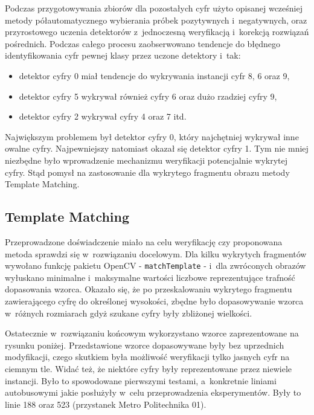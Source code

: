 Podczas przygotowywania zbiorów dla pozostałych cyfr użyto 
opisanej wcześniej metody półautomatycznego wybierania próbek pozytywnych
i~negatywnych, oraz przyrostowego uczenia detektorów z~jednoczesną
weryfikacją i~korekcją rozwiązań pośrednich. Podczas całego
procesu zaobserwowano tendencje do błędnego identyfikowania cyfr pewnej
klasy przez uczone detektory i~tak:

\begin{itemize}
    \item detektor cyfry 0 miał tendencje do wykrywania instancji cyfr
        8, 6 oraz 9,
    \item detektor cyfry 5 wykrywał również cyfry 6 oraz dużo rzadziej
        cyfry 9,
    \item detektor cyfry 2 wykrywał cyfry 4 oraz 7 itd.
\end{itemize}

Największym problemem był detektor cyfry 0, który najchętniej
wykrywał inne owalne cyfry. Najpewniejszy natomiast okazał się
detektor cyfry 1. Tym nie mniej niezbędne było wprowadzenie
mechanizmu weryfikacji potencjalnie wykrytej cyfry. Stąd 
pomysł na zastosowanie dla wykrytego fragmentu obrazu metody
Template Matching.

\subsection{Template Matching}

Przeprowadzone doświadczenie miało na celu weryfikację czy
proponowana metoda sprawdzi się w~rozwiązaniu docelowym. Dla
kilku wykrytych fragmentów wywołano funkcję pakietu OpenCV 
- \verb|matchTemplate| - i~dla zwróconych obrazów wyłuskano
minimalne i~maksymalne wartości liczbowe reprezentujące trafność
dopasowania wzorca. Okazało się, że po przeskalowaniu wykrytego
fragmentu zawierającego cyfrę do określonej wysokości, zbędne
było dopasowywanie wzorca w~różnych rozmiarach gdyż szukane cyfry
były zbliżonej wielkości. 

Ostatecznie w~rozwiązaniu końcowym wykorzystano wzorce zaprezentowane
na rysunku poniżej.
Przedstawione wzorce dopasowywane były bez uprzednich modyfikacji,
czego skutkiem była możliwość weryfikacji tylko jasnych cyfr
na ciemnym tle. Widać też, że niektóre cyfry były reprezentowane
przez niewiele instancji. Było to spowodowane pierwszymi testami,
a~konkretnie liniami autobusowymi jakie posłużyły w~celu
przeprowadzenia eksperymentów. Były to linie 188 oraz 523 (przystanek
Metro Politechnika 01). 

